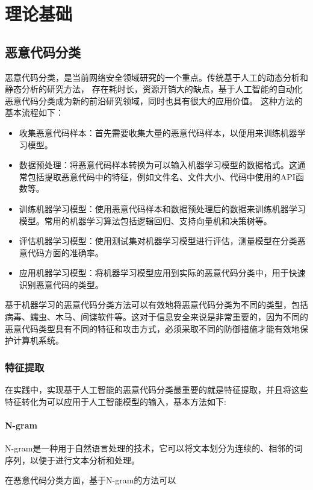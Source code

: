 
\chapter{理论基础}

\section{恶意代码分类}
恶意代码分类，是当前网络安全领域研究的一个重点。传统基于人工的动态分析和静态分析的研究方法，
存在耗时长，资源开销大的缺点，基于人工智能的自动化恶意代码分类成为新的前沿研究领域，同时也具有很大的应用价值。
这种方法的基本流程如下：
\begin{itemize}
    \item 收集恶意代码样本：首先需要收集大量的恶意代码样本，以便用来训练机器学习模型。
    \item 数据预处理：将恶意代码样本转换为可以输入机器学习模型的数据格式。这通常包括提取恶意代码中的特征，例如文件名、文件大小、代码中使用的API函数等。
    \item 训练机器学习模型：使用恶意代码样本和数据预处理后的数据来训练机器学习模型。常用的机器学习算法包括逻辑回归、支持向量机和决策树等。
    \item 评估机器学习模型：使用测试集对机器学习模型进行评估，测量模型在分类恶意代码方面的准确率。
    \item 应用机器学习模型：将机器学习模型应用到实际的恶意代码分类中，用于快速识别恶意代码的类型。
\end{itemize}

基于机器学习的恶意代码分类方法可以有效地将恶意代码分类为不同的类型，包括病毒、蠕虫、木马、间谍软件等。这对于信息安全来说是非常重要的，因为不同的恶意代码类型具有不同的特征和攻击方式，必须采取不同的防御措施才能有效地保护计算机系统。

\subsection{特征提取}
在实践中，实现基于人工智能的恶意代码分类最重要的就是特征提取，并且将这些特征转化为可以应用于人工智能模型的输入，基本方法如下:\cite{李豪2022恶意代码可视化检测技术研究综述}
\subsubsection{N-gram}
N-gram是一种用于自然语言处理的技术，它可以将文本划分为连续的、相邻的词序列，以便于进行文本分析和处理。

在恶意代码分类方面，基于N-gram的方法可以%

